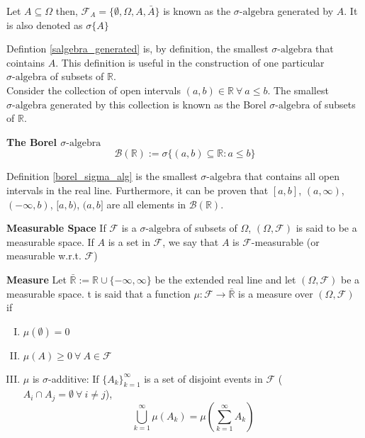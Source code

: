 \documentclass[11pt]{report}
\newcommand{\salg}{\sigma\text{-algebra}}
\newcommand{\borelsalg}{\mathscr{B}(\mathbb{R})}
\begin{document}
\begin{definition}\label{salgebra_generated}
	Let $A \subseteq \Omega$ then, $\mathscr{F}_A = \{\emptyset, \Omega, A, \bar{A}\}$ is known as the $\salg$ generated by $A$. It is also denoted as $\sigma\{A\}$
\end{definition}

Defintion \ref{salgebra_generated} is, by definition, the smallest $\salg$ that cointains $A$. This definition is useful in the construction of one particular $\salg$ of subsets of $\mathbb{R}$.\\

Consider the collection of open intervals $(a,b) \in \mathbb{R} \ \forall \ a \leq b$. The smallest $\salg$ generated by this collection is known as the Borel $\salg$ of subsets of $\mathbb{R}$.

\begin{definition}{\textbf{The Borel $\salg$}}\label{borel_sigma_alg}
		\begin{equation}
			\borelsalg := \sigma\{(a,b) \subseteq \mathbb{R}:a\leq b\}
		\end{equation}
\end{definition}

Definition \ref{borel_sigma_alg} is the smallest $\salg$ that contains all open intervals in the real line. Furthermore, it can be proven that $[a, b]$, $(a,\infty)$, $(-\infty, b)$, $[a, b)$, $(a, b]$ are all elements in $\borelsalg$. 

\begin{definition}{\textbf{Measurable Space}}
	If $\mathscr{F}$ is a $\salg$ of subsets of $\Omega$, $(\Omega, \mathscr{F})$ is said to be a measurable space. If $A$ is a set in $\mathscr{F}$, we say that $A$ is $\mathscr{F}$-measurable (or measurable w.r.t. $\mathscr{F}$)
\end{definition}

\begin{definition}{\textbf{Measure}}
	Let $\bar{\mathbb R} := \mathbb R \cup \{-\infty, \infty\}$ be the extended real line and let $(\Omega, \mathscr{F})$ be a measurable space. t is said that a function $\mu: \mathscr{F} \rightarrow \bar{\mathbb R}$ is a measure over $(\Omega, \mathscr{F})$ if
	\begin{enumerate}[I.]
		\item $\mu(\emptyset) = 0$
		\item $\mu(A) \geq 0\ \forall \ A \in \mathscr{F} $
		\item $\mu$ is $\sigma$-additive: If $\{A_k\}_{k=1}^{\infty}$ is a set of disjoint events in $\mathscr{F}$ ($A_i \cap A_j = \emptyset \ \forall \ i \neq j$), 
		\begin{equation*}
			\bigcup_{k=1}^{\infty} \mu(A_k) = \mu(\sum_{k=1}^{\infty} A_k)
		\end{equation*}
	\end{enumerate}
\end{definition}
\end{document}
